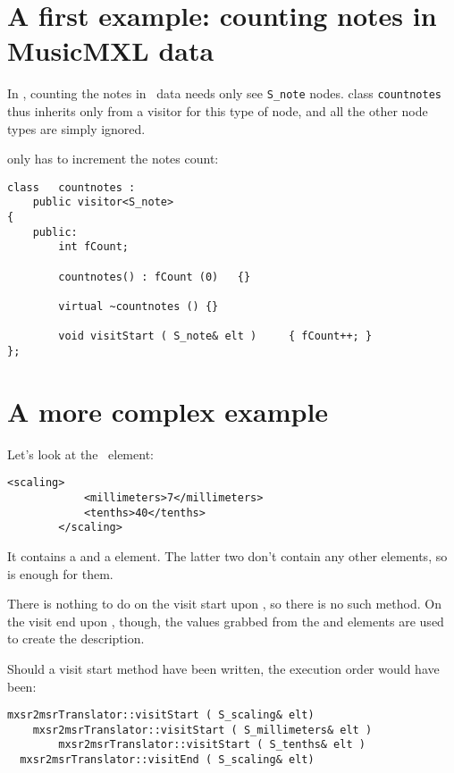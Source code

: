 \section{A first example: counting notes in MusicMXL data}

In , counting the notes in \mxml\ data needs only see {\tt S_note} nodes. class   {\tt countnotes} thus inherits only from a visitor for this type of node, and all the other node types are simply ignored.

 only has to increment the notes count:
\begin{lstlisting}[language=CPlusPlus,caption={{\tt countnotes.cpp}}]
class   countnotes :
	public visitor<S_note>
{
	public:
		int	fCount;

		countnotes() : fCount (0)	{}

		virtual ~countnotes () {}

		void visitStart ( S_note& elt )		{ fCount++; }
};
\end{lstlisting}

\section{A more complex example}

Let's look at the  \mxml\ element:
\begin{lstlisting}[language=MusicXML]
		<scaling>
			<millimeters>7</millimeters>
			<tenths>40</tenths>
		</scaling>
\end{lstlisting}

It contains a  and a  element. The latter two don't contain any other elements, so  is enough for them.

There is nothing to do on the visit start upon , so there is no such method.
On the visit end upon , though, the values grabbed from the  and  elements are used to create the  description.

Should a visit start method have been written, the execution order would have been:
\begin{lstlisting}[language=CPlusPlus]
  mxsr2msrTranslator::visitStart ( S_scaling& elt)
  	mxsr2msrTranslator::visitStart ( S_millimeters& elt )
		mxsr2msrTranslator::visitStart ( S_tenths& elt )
  mxsr2msrTranslator::visitEnd ( S_scaling& elt)
\end{lstlisting}

